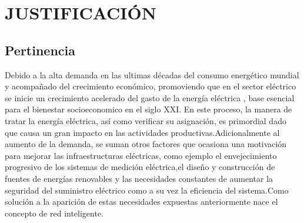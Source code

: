 \documentclass[12pt,letterpaper]{article}
\begin{document}
\section{JUSTIFICACIÓN}


\subsection{Pertinencia}

Debido a la alta demanda  en las ultimas décadas del consumo energético mundial y acompañado del crecimiento económico, promoviendo que en el  sector eléctrico se inicie un crecimiento acelerado del gasto de la energía eléctrica , base esencial para el bienestar socioeconomico en el siglo XXI. En este proceso, la manera de tratar la energía eléctrica, así como verificar su asignación, es primordial dado que causa un gran impacto en las actividades productivas.Adicionalmente al aumento de la demanda, se suman otros factores que ocasiona una motivación para mejorar las infraestructuras eléctricas, como ejemplo el envejecimiento progresivo de los sistemas de medición eléctrica,el diseño y construcción de fuentes de energías renovables y las necesidades constantes de aumentar la seguridad del suministro eléctrico como a su vez la eficiencia del sistema.Como solución a la aparición de estas necesidades expuestas anteriormente nace el concepto de red inteligente.\cite{ColombiaInteligente2016}           
\end{document}
